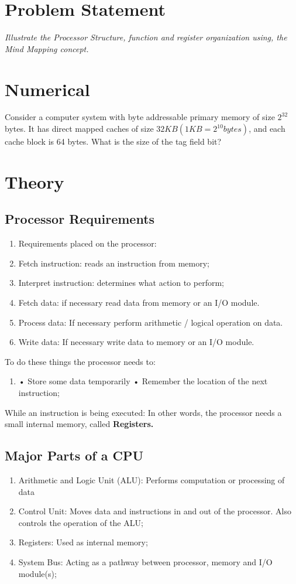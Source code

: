 \documentclass[11pt]{article}
\begin{document}
\tableofcontents
\thispagestyle{empty}
\clearpage


\setcounter{page}{1}
\section{Problem Statement}
\textit{Illustrate the Processor Structure, function and register organization using, the Mind Mapping concept.}

\section{Numerical}
Consider a computer system with byte addressable primary memory of size
$2^32$ bytes. It has direct mapped caches of size $32KB(1KB = 2^10 bytes)$,
and each cache block is 64 bytes. What is the size of the tag field bit?

\section{Theory}
\subsection{Processor Requirements}
\begin{enumerate}
	\item Requirements placed on the processor:
	\item Fetch instruction: reads an instruction from memory;
	\item Interpret instruction: determines what action to perform;
	\item Fetch data: if necessary read data from memory or an I/O module.
	\item Process data: If necessary perform arithmetic / logical operation on data.
	\item Write data: If necessary write data to memory or an I/O module.
\end{enumerate}

To do these things the processor needs to:
\begin{enumerate}
	\item
	      • Store some data temporarily
	      • Remember the location of the next instruction;
\end{enumerate}
While an instruction is being executed: In other words, the processor needs a small internal memory, called \textbf{Registers.}


\subsection{Major Parts of a CPU}
\begin{enumerate}
	\item Arithmetic and Logic Unit (ALU): Performs computation or processing of data
	\item Control Unit: Moves data and instructions in and out of the processor. Also controls the operation of the ALU;
	\item Registers: Used as internal memory;
	\item System Bus: Acting as a pathway between processor, memory and I/O module(s);
\end{enumerate}
\end{document}

